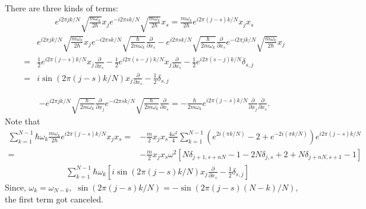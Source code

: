 \begin{enumerate}
    There are three kinds of terms:
    \begin{align*}
        e^{i2\pi jk/N}
        \sqrt{\frac{m\omega_k}{2\hbar}}x_j
        e^{-i2\pi sk/N}
        \sqrt{\frac{m\omega_k}{2\hbar}}x_s
        =\frac{m\omega_k}{2\hbar}
        e^{i2\pi (j-s)k/N}
        x_jx_s
    \end{align*}
    \begin{align*}
        &e^{i2\pi jk/N}
        \sqrt{\frac{m\omega_k}{2\hbar}}x_j
        e^{-i2\pi sk/N}
        \sqrt{\frac{\hbar}{2m\omega_k}}\frac{\partial}{\partial x_s}
        -
        e^{i2\pi sk/N}
        \sqrt{\frac{\hbar}{2m\omega_k}}
        \frac{\partial}{\partial x_s}
        e^{-i2\pi jk/N}
        \sqrt{\frac{m\omega_k}{2\hbar}}x_j
        \\
        =&
        \frac{1}{2}e^{i2\pi(j-s)k/N}x_j\frac{\partial}{\partial x_s}
        -\frac{1}{2}e^{i2\pi(s-j)k/N}x_j\frac{\partial}{\partial x_s}
        -\frac{1}{2}e^{i2\pi(s-j)k/N}\delta_{s,j}\\
        =&i\sin(2\pi(j-s)k/N)x_j\frac{\partial}{\partial x_s}
        -\frac{1}{2}\delta_{s,j}
    \end{align*}

    \begin{align*}
        -e^{i2\pi jk/N}
        \sqrt{\frac{\hbar}{2m\omega_k}}\frac{\partial}{\partial x_j}
        e^{-i2\pi sk/N}
        \sqrt{\frac{\hbar}{2m\omega_k}}\frac{\partial}{\partial x_s}
        =-\frac{\hbar}{2m\omega_k}
        e^{i2\pi (j-s)k/N}
        \frac{\partial}{\partial x_j}\frac{\partial}{\partial x_s}.
    \end{align*}
    Note that
    \begin{align*}
        \sum_{k=1}^{N-1}
        \hbar\omega_k
        \frac{m\omega_k}{2\hbar}
        e^{i2\pi (j-s)k/N}
        x_jx_s
        =&
        -\frac{m}{2}
        x_jx_s 
        \frac{4\omega^2}{4}
        \sum_{k=1}^{N-1}
        (e^{2i(\pi k /N)}
        -2+
        e^{-2i(\pi k /N)})
        e^{i2\pi (j-s)k/N}\\
        =&
        -\frac{m}{2}
        x_jx_s 
        \omega^2
        \left[
        N\delta_{j+1,s+nN} - 1
        -2N\delta_{j,s} + 2
        +N\delta_{j+nN,s+1} - 1
        \right]
    \end{align*}
    \begin{align*}
         &\sum_{k=1}^{N-1}\hbar \omega_k
        [i\sin(2\pi(j-s)k/N)x_j\frac{\partial}{\partial x_s}
        -\frac{1}{2}\delta_{s,j}]
    \end{align*}
    Since, $\omega_k = \omega_{N-k},$ $\sin(2\pi(j-s)k/N)=-\sin(2\pi(j-s)(N-k)/N),$ the first term got canceled.
    

\end{enumerate}
